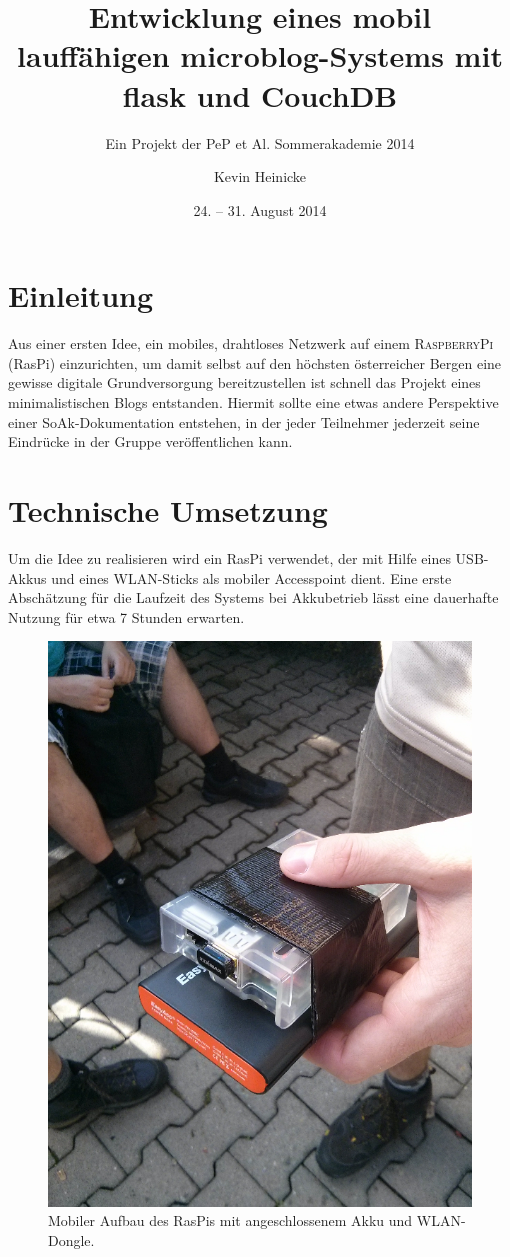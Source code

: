 

\title{Entwicklung eines mobil lauffähigen microblog-Systems mit flask und
CouchDB}
\subtitle{Ein Projekt der PeP et Al. Sommerakademie 2014}
\date{24. -- 31. August 2014}

\author{
    Kevin Heinicke
}



\maketitle
\tableofcontents

\section{Einleitung}
Aus einer ersten Idee, ein mobiles, drahtloses Netzwerk auf einem
\textsc{RaspberryPi} (RasPi) einzurichten, um damit selbst auf den höchsten
österreicher Bergen eine gewisse digitale Grundversorgung bereitzustellen
ist schnell das Projekt eines minimalistischen Blogs entstanden.
Hiermit sollte eine etwas andere Perspektive einer SoAk-Dokumentation
entstehen, in der jeder Teilnehmer jederzeit seine Eindrücke in der Gruppe
veröffentlichen kann.

\section{Technische Umsetzung}
Um die Idee zu realisieren wird ein RasPi verwendet,
der mit Hilfe eines USB-Akkus und eines WLAN-Sticks als mobiler
Accesspoint dient.
Eine erste Abschätzung für die Laufzeit des Systems bei Akkubetrieb lässt
eine dauerhafte Nutzung für etwa 7 Stunden erwarten.
\begin{figure}[h]
  \centering
  \includegraphics[width=0.4\linewidth]{images/raspi1.jpg}
  \caption{Mobiler Aufbau des RasPis mit angeschlossenem Akku
  und WLAN-Dongle.}
  \label{fig:raspi}
\end{figure}

